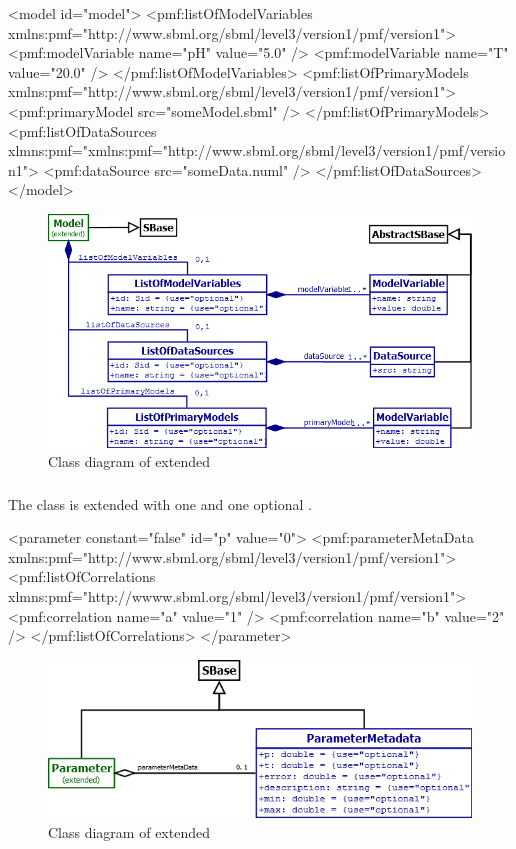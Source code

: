 \begin{example}
<model id="model">
  <pmf:listOfModelVariables xmlns:pmf="http://www.sbml.org/sbml/level3/version1/pmf/version1">
    <pmf:modelVariable name="pH" value="5.0" />
    <pmf:modelVariable name="T" value="20.0" />
  </pmf:listOfModelVariables>
  <pmf:listOfPrimaryModels xmlns:pmf="http://www.sbml.org/sbml/level3/version1/pmf/version1">
    <pmf:primaryModel src="someModel.sbml" />
  </pmf:listOfPrimaryModels>
  <pmf:listOfDataSources
    xlmns:pmf="xmlns:pmf="http://www.sbml.org/sbml/level3/version1/pmf/version1">
    <pmf:dataSource src="someData.numl" />
  </pmf:listOfDataSources>
</model>
\end{example}

\begin{figure}
	\includegraphics[scale=0.6]{img/model_uml}
	\caption{Class diagram of extended \Model}
	\label{model_uml}
\end{figure}

\subsubsection{}
The \Parameter class is extended with one \ListOfCorrelations and one optional
\ParameterMetaData.

\begin{example}
<parameter constant="false" id="p" value="0">
  <pmf:parameterMetaData xmlns:pmf="http://www.sbml.org/sbml/level3/version1/pmf/version1">
  <pmf:listOfCorrelations xlmns:pmf="http://wwww.sbml.org/sbml/level3/version1/pmf/version1">
    <pmf:correlation name="a" value="1" />
    <pmf:correlation name="b" value="2" />
  </pmf:listOfCorrelations>
</parameter>
\end{example}

\begin{figure}
	\includegraphics[scale=0.7]{img/parameter_uml}
	\caption{Class diagram of extended \Parameter}
	\label{parameter_uml}
\end{figure}

